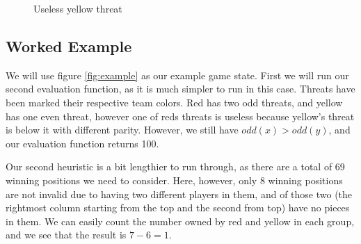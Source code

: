 \documentclass{article}
\newcommand{\rd}{\node [player, fill=red]{};}
\newcommand{\yw}{\node [player, fill=yellow] {};}
\newcommand{\gy}{\node [player, fill=white] {};}
\newcommand{\bt}{\node [threat, fill=orange!50] {};}
\begin{document}
\begin{figure}[t]
	\centering
	\caption{Useless yellow threat}
	\label{threatblock}
\end{figure}
\subsection{Worked Example}
We will use figure \ref{fig:example} as our example game state. First we will run our second evaluation function, as it is much simpler to run in this case. Threats have been marked their respective team colors. Red has two odd threats, and yellow has one even threat, however one of reds threats is useless because yellow's threat is below it with different parity. However, we still have $odd(x) > odd(y)$, and our evaluation function returns 100.
	
Our second heuristic is a bit lengthier to run through, as there are a total of 69 winning positions we need to consider. Here, however, only 8 winning positions are not invalid due to having two different players in them, and of those two (the rightmost column starting from the top and the second from top) have no pieces in them. We can easily count the number owned by red and yellow in each group, and we see that the result is $7-6 = 1$.
\end{document}
